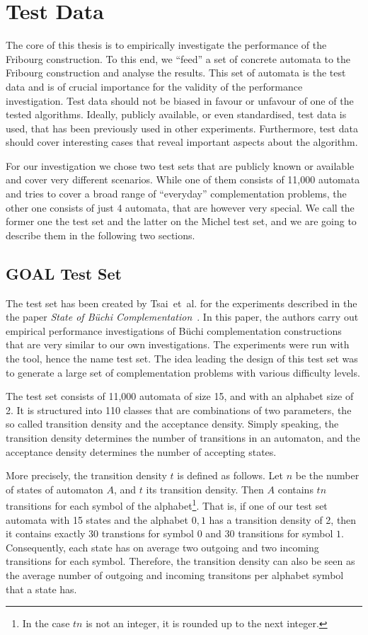 \section{Test Data}
The core of this thesis is to empirically investigate the performance of the Fribourg construction. To this end, we ``feed'' a set of concrete automata to the Fribourg construction and analyse the results. This set of automata is the test data and is of crucial importance for the validity of the performance investigation. Test data should not be biased in favour or unfavour of one of the tested algorithms. Ideally, publicly available, or even standardised, test data is used, that has been previously used in other experiments. Furthermore, test data should cover interesting cases that reveal important aspects about the algorithm.

For our investigation we chose two test sets that are publicly known or available and cover very different scenarios. While one of them consists of 11,000 automata and tries to cover a broad range of ``everyday'' complementation problems, the other one consists of just 4 automata, that are however very special. We call the former one the \goal{} test set and the latter on the Michel test set, and we are going to describe them in the following two sections.


\subsection{GOAL Test Set}
\label{4_goal_testset}
The \goal{} test set has been created by Tsai~et~al. for the experiments described in the the paper \textit{State of Büchi Complementation}~\cite{2010_tsai}. In this paper, the authors carry out empirical performance investigations of Büchi complementation constructions that are very similar to our own investigations. The experiments were run with the \goal{} tool, hence the name \goal{} test set. The idea leading the design of this test set was to generate a large set of complementation problems with various difficulty levels.

The test set consists of 11,000 automata of size 15, and with an alphabet size of 2. It is structured into 110 classes that are combinations of two parameters, the so called transition density and the acceptance density. Simply speaking, the transition density determines the number of transitions in an automaton, and the acceptance density determines the number of accepting states.

More precisely, the transition density $t$ is defined as follows. Let $n$ be the number of states of automaton $A$, and $t$ its transition density. Then $A$ contains $tn$ transitions for each symbol of the alphabet\footnote{In the case $tn$ is not an integer, it is rounded up to the next integer.}. That is, if one of our test set automata with 15 states and the alphabet ${0, 1}$ has a transition density of 2, then it contains exactly 30 transtions for symbol $0$ and 30 transitions for symbol $1$. Consequently, each state has on average two outgoing and two incoming transitions for each symbol. Therefore, the transition density can also be seen as the average number of outgoing and incoming transitons per alphabet symbol that a state has.

